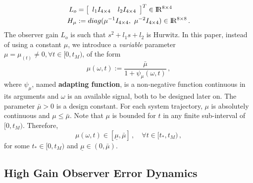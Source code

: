 \documentclass[letterpaper, 10 pt, journal, twocolumn]{IEEEtran}  %
\def\re{{\rm I}\! {\rm R}}
\theoremstyle{plain}
\theoremstyle{definition}
\theoremstyle{remark}
\newtheorem*{remark}{Remark}
\begin{document}
%
\begin{subequations}
	\label{eq:defLhgo_and_Hhgo}
	\begin{align}
		L_o &= \left[\begin{array}{cc}  l_1 I_{4 \times 4} & l_2 I_{4 \times 4} \end{array} \right]^T \in \re^{8 \times 4} 
		\\
		H_\mu &:= \mbox{diag}(\mu^{-1}  I_{4 \times 4}, \ \mu^{-2} I_{4 \times 4}) \in \re^{8 \times 8}\,.
	\end{align}
\end{subequations}
%
%
%
The observer gain $L_o$ is such that $s^{2}+l_1
s+ l_2$ is Hurwitz. In this paper,
instead of using a constant $\mu$, we introduce a {\em variable}
parameter $\mu=\mu_(t)\neq\!0, \forall t\in[0,t_M)$, %
of the form
%
\begin{equation}
\mu(\omega,t):=\frac{\bar{\mu}}{1+
\psi_\mu(\omega,t)}\,,\label{eq:def_mu}
\end{equation}
%
where $\psi_\mu$, named \textbf{adapting function}, is a
non-negative function continuous in its
arguments and $\omega$ is an available signal, both to be designed later on. The parameter $\bar{\mu}\!>\!0$ is a design constant. For each
system trajectory, $\mu$ is absolutely continuous and
$\mu\!\leq\!\bar{\mu}$. Note that $\mu$ is bounded for $t$ in any
finite sub-interval of $[0,t_M)$. Therefore,
%
\begin{equation}
\mu(\omega,t)\in[\underline{\mu},\bar{\mu}]\,, \quad \forall
t\!\in\![t_*,t_M)\,, \label{eq:P3}
\end{equation}
%
for some $t_* \in [0,t_M)$ and
$\underline{\mu}\!\in\!(0,\bar{\mu})$. 



\subsection{High Gain Observer Error Dynamics}
\end{document}
